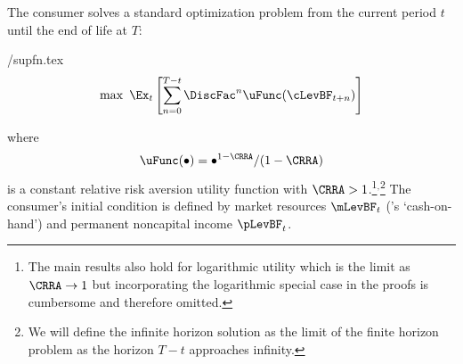 \documentclass[BufferStockTheory]{subfiles}
\begin{document}
The consumer solves a standard optimization problem from the current period $t$ until the end of life at $T$: 
\begin{verbatimwrite}{\EqDir/supfn.tex}
  \begin{align*}%
    \max~ \Ex_{t}\left[\sum_{n=0}^{T-t} \DiscFac^{n} \uFunc(\cLevBF_{t+n})\right]
  \end{align*}
\end{verbatimwrite}

where
\begin{equation}\begin{gathered}\begin{aligned}
  \uFunc(\bullet)=\bullet^{1-\CRRA}/(1-\CRRA) \label{eq:crrautil}
\end{aligned}\end{gathered}\end{equation}
is a constant relative risk aversion utility function with $\CRRA > 1$.\footnote{The main
  results also hold for logarithmic utility which is the limit as
  $\CRRA \rightarrow 1$ but incorporating the logarithmic special case
  in the proofs is cumbersome and therefore
  omitted.}$^{,}$\footnote{We will define the infinite horizon
  solution as the limit of the finite horizon problem as the horizon
  $T-t$ approaches infinity.}  The consumer's initial condition is
defined by market resources $\mLevBF_{t}$ (\cite{deatonLiqConstr}'s
`cash-on-hand') and permanent noncapital income $\pLevBF_{t}$.
\end{document}

